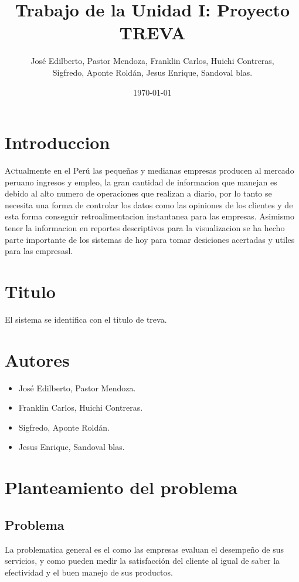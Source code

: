 \documentclass[twoside,twocolumn]{article}
\title{Trabajo de la Unidad I: Proyecto TREVA}
\author{José Edilberto, Pastor Mendoza, Franklin Carlos, Huichi Contreras, \\
Sigfredo, Aponte Roldán, Jesus Enrique, Sandoval blas. }
\date{\today}
\begin{document}
\maketitle


\section{Introduccion}
\lettrine[nindent=0em,lines=3]{A}ctualmente en el Perú las pequeñas y medianas empresas producen al mercado peruano ingresos y empleo, la gran cantidad de informacion que manejan es debido al alto numero de operaciones que realizan a diario, por lo tanto se necesita una forma de controlar los datos como las opiniones de los clientes y de esta forma conseguir retroalimentacion instantanea para las empresas. Asimismo tener la informacion en reportes descriptivos para la visualizacion se ha hecho parte importante de los sistemas de hoy para tomar desiciones acertadas y utiles para las empresasl.

\section{Titulo}
El sistema se identifica con el titulo de treva.

\section{Autores}
\begin{itemize}
\item José Edilberto, Pastor Mendoza.
\item Franklin Carlos, Huichi Contreras.
\item Sigfredo, Aponte Roldán.
\item Jesus Enrique, Sandoval blas.
\end{itemize}

\section{Planteamiento del problema}
\subsection{Problema}
La problematica general es el como las empresas evaluan el desempeño de sus servicios, y como pueden medir la satisfacción del cliente al igual de saber la efectividad y el buen manejo de sus productos.
\end{document}
